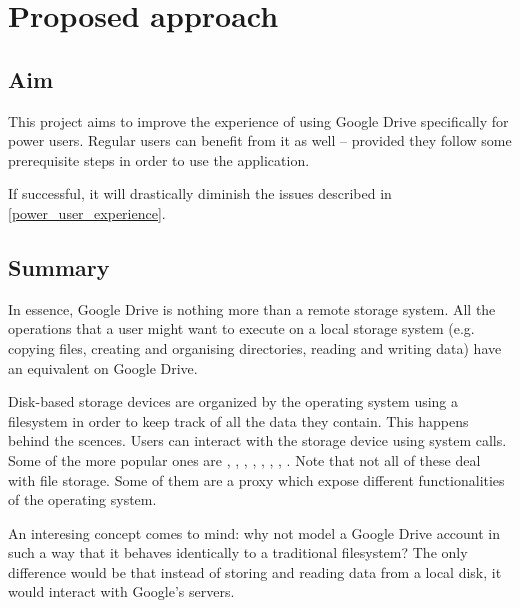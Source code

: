 \chapter{Proposed approach}

\section{Aim}

This project aims to improve the experience of using Google Drive specifically for power users. Regular users can benefit from it as well -- provided they follow some prerequisite steps in order to use the application.

If successful, it will drastically diminish the issues described in \ref{power_user_experience}.

\section{Summary}

In essence, Google Drive is nothing more than a remote storage system. All the operations that a user might want to execute on a local storage system (e.g. copying files, creating and organising directories, reading and writing data) have an equivalent on Google Drive.

Disk-based storage devices are organized by the operating system using a filesystem in order to keep track of all the data they contain. This happens behind the scences. Users can interact with the storage device using system calls. Some of the more popular ones are , , , , , , , . Note that not all of these deal with file storage. Some of them are a proxy which expose different functionalities of the operating system.

An interesing concept comes to mind: why not model a Google Drive account in such a way that it behaves identically to a traditional filesystem? The only difference would be that instead of storing and reading data from a local disk, it would interact with Google's servers.
